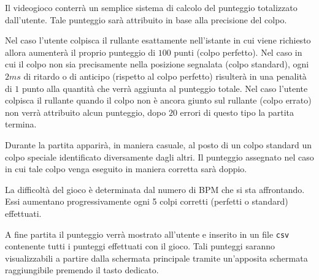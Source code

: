 \medskip
Il videogioco conterrà un semplice sistema di calcolo del punteggio totalizzato dall'utente.
Tale punteggio sarà attribuito in base alla precisione del colpo.

Nel caso l'utente colpisca il rullante esattamente nell'istante in cui viene richiesto allora aumenterà il proprio punteggio di $100$ punti (colpo perfetto).
Nel caso in cui il colpo non sia precisamente nella posizione segnalata (colpo standard), ogni $2 ms$ di ritardo o di anticipo (rispetto al colpo perfetto) risulterà in una penalità di $1$ punto alla quantità che verrà aggiunta al punteggio totale.
Nel caso l'utente colpisca il rullante quando il colpo non è ancora giunto sul rullante (colpo errato) non verrà attribuito alcun punteggio, dopo $20$ errori di questo tipo la partita termina.

Durante la partita apparirà, in maniera casuale, al posto di un colpo standard un colpo speciale identificato diversamente dagli altri. Il punteggio assegnato nel caso in cui tale colpo venga eseguito in maniera corretta sarà doppio.

La difficoltà del gioco è determinata dal numero di BPM che si sta affrontando. Essi aumentano progressivamente ogni 5 colpi corretti (perfetti o standard) effettuati.

A fine partita il punteggio verrà mostrato all'utente e inserito in un file \texttt{csv} contenente tutti i punteggi effettuati con il gioco. Tali punteggi saranno visualizzabili a partire dalla schermata principale tramite un'apposita schermata raggiungibile premendo il tasto dedicato.